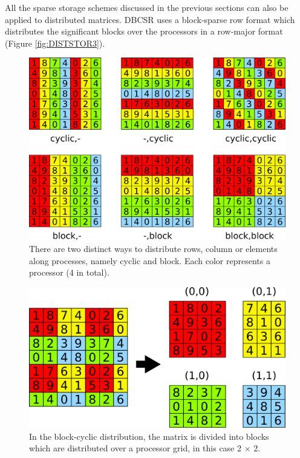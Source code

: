 All the sparse storage schemes discussed in the previous sections can also be applied to distributed matrices. DBCSR uses a block-sparse row format which distributes the significant blocks over the processors in a row-major format (Figure \ref{fig:DISTSTOR3}). 

\begin{figure}
\centering
\includegraphics[scale=0.25]{Pics/DISTSTOR1.pdf}
\caption[Cyclic and blocked distribution]{There are two distinct ways to distribute rows, column or elements along processes, namely cyclic and block. Each color represents a processor (4 in total).}
\label{fig:DISTSTOR1}
\end{figure}

\begin{figure}
\centering
\includegraphics[scale=0.25]{Pics/DISTSTOR2.pdf}
\caption[Block-cyclic distribution]{In the block-cyclic distribution, the matrix is divided into blocks which are distributed over a processor grid, in this case 2 $\times$ 2.}
\label{fig:DISTSTOR2}
\end{figure}

